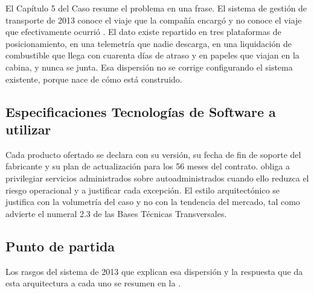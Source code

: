 El Capítulo 5 del Caso resume el problema en una frase. El sistema de gestión de transporte de 2013
conoce el viaje que la compañía encargó y no conoce el viaje que efectivamente ocurrió
. El dato existe repartido en tres plataformas de posicionamiento, en una
telemetría que nadie descarga, en una liquidación de combustible que llega con cuarenta días de
atraso y en papeles que viajan en la cabina, y nunca se junta. Esa dispersión no se corrige
configurando el sistema existente, porque nace de cómo está construido.


\subsection{Especificaciones Tecnologías de Software a utilizar}\label{sec:4-software}

Cada producto ofertado se declara con su versión, su fecha de fin de soporte del fabricante y su plan
de actualización para los 56 meses del contrato.  obliga a privilegiar servicios
administrados sobre autoadministrados cuando ello reduzca el riesgo operacional y a justificar cada
excepción. El estilo arquitectónico se justifica con la volumetría del caso y no con la tendencia del
mercado, tal como advierte el numeral 2.3 de las Bases Técnicas Transversales.


\subsection{Punto de partida}\label{sec:4-partida}

Los rasgos del sistema de 2013 que explican esa dispersión y la respuesta que da esta arquitectura a
cada uno se resumen en la .

